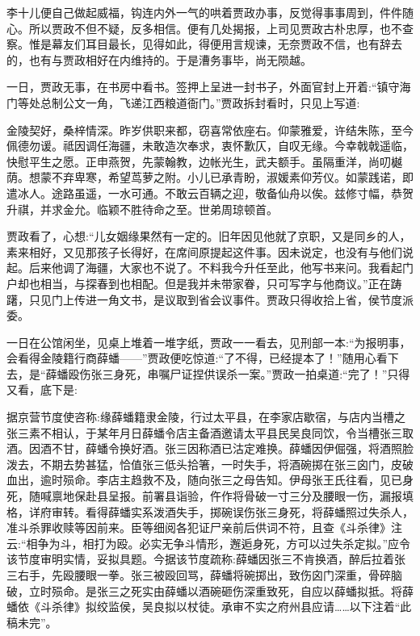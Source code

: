 \begin{parag}
    李十儿便自己做起威福，钩连内外一气的哄着贾政办事，反觉得事事周到，件件随心。所以贾政不但不疑，反多相信。便有几处揭报，上司见贾政古朴忠厚，也不查察。惟是幕友们耳目最长，见得如此，得便用言规谏，无奈贾政不信，也有辞去的，也有与贾政相好在内维持的。于是漕务事毕，尚无陨越。
\end{parag}


\begin{parag}
    一日，贾政无事，在书房中看书。签押上呈进一封书子，外面官封上开着:“镇守海门等处总制公文一角，飞递江西粮道衙门。”贾政拆封看时，只见上写道:
\end{parag}


\begin{qute2sp}
    金陵契好，桑梓情深。昨岁供职来都，窃喜常依座右。仰蒙雅爱，许结朱陈，至今佩德勿谖。祗因调任海疆，未敢造次奉求，衷怀歉仄，自叹无缘。今幸戟戟遥临，快慰平生之愿。正申燕贺，先蒙翰教，边帐光生，武夫额手。虽隔重洋，尚叨樾荫。想蒙不弃卑寒，希望茑萝之附。小儿已承青盼，淑媛素仰芳仪。如蒙践诺，即遣冰人。途路虽遥，一水可通。不敢云百辆之迎，敬备仙舟以俟。兹修寸幅，恭贺升祺，并求金允。临颖不胜待命之至。世弟周琼顿首。
\end{qute2sp}


\begin{parag}
    贾政看了，心想:“儿女姻缘果然有一定的。旧年因见他就了京职，又是同乡的人，素来相好，又见那孩子长得好，在席间原提起这件事。因未说定，也没有与他们说起。后来他调了海疆，大家也不说了。不料我今升任至此，他写书来问。我看起门户却也相当，与探春到也相配。但是我并未带家眷，只可写字与他商议。”正在踌躇，只见门上传进一角文书，是议取到省会议事件。贾政只得收拾上省，侯节度派委。
\end{parag}


\begin{parag}
    一日在公馆闲坐，见桌上堆着一堆字纸，贾政一一看去，见刑部一本:“为报明事，会看得金陵籍行商薛蟠——”贾政便吃惊道:“了不得，已经提本了！”随用心看下去，是“薛蟠殴伤张三身死，串嘱尸证捏供误杀一案。”贾政一拍桌道:“完了！”只得又看，底下是:
\end{parag}


\begin{qute2sp}
    据京营节度使咨称:缘薛蟠籍隶金陵，行过太平县，在李家店歇宿，与店内当槽之张三素不相认，于某年月日薛蟠令店主备酒邀请太平县民吴良同饮，令当槽张三取酒。因酒不甘，薛蟠令换好酒。张三因称酒已沽定难换。薛蟠因伊倔强，将酒照脸泼去，不期去势甚猛，恰值张三低头拾箸，一时失手，将酒碗掷在张三囟门，皮破血出，逾时殒命。李店主趋救不及，随向张三之母告知。伊母张王氏往看，见已身死，随喊禀地保赴县呈报。前署县诣验，仵作将骨破一寸三分及腰眼一伤，漏报填格，详府审转。看得薛蟠实系泼酒失手，掷碗误伤张三身死，将薛蟠照过失杀人，准斗杀罪收赎等因前来。臣等细阅各犯证尸亲前后供词不符，且查《斗杀律》注云:“相争为斗，相打为殴。必实无争斗情形，邂逅身死，方可以过失杀定拟。”应令该节度审明实情，妥拟具题。今据该节度疏称:薛蟠因张三不肯换酒，醉后拉着张三右手，先殴腰眼一拳。张三被殴回骂，薛蟠将碗掷出，致伤囟门深重，骨碎脑破，立时殒命。是张三之死实由薛蟠以酒碗砸伤深重致死，自应以薛蟠拟抵。将薛蟠依《斗杀律》拟绞监侯，吴良拟以杖徒。承审不实之府州县应请……以下注着“此稿未完”。
\end{qute2sp}


